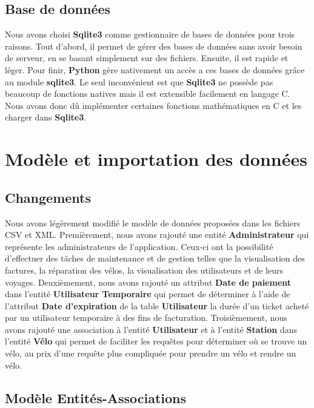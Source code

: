 \documentclass[a4paper,11pt]{report}
\begin{document}
\section{Base de données}
Nous avons choisi \textbf{Sqlite3} comme gestionnaire de bases de données pour trois raisons. Tout d'abord, il permet de gérer des bases de données sans avoir besoin de serveur, en se basant simplement sur des fichiers. Ensuite, il est rapide et léger. Pour finir, \textbf{Python} gère nativement un accès a ces bases de données grâce au module \textbf{sqlite3}.
Le seul inconvénient est que \textbf{Sqlite3} ne possède pas beaucoup de fonctions natives mais il est extensible facilement en langage C.
Nous avons donc dû implémenter certaines fonctions mathématiques en C et les charger dans \textbf{Sqlite3}.

\chapter{Modèle et importation des données}

\section{Changements}
Nous avons légèrement modifié le modèle de données proposées dans les fichiers CSV et XML.
Premièrement, nous avons rajouté une entité \textbf{Administrateur} qui représente les administrateurs de l'application. Ceux-ci ont la possibilité d'effectuer des tâches de maintenance et de gestion telles que la visualisation des factures, la réparation des vélos, la visualisation des utilisateurs et de leurs voyages.
Deuxièmement, nous avons rajouté un attribut \textbf{Date de paiement} dans l'entité \textbf{Utilisateur Temporaire} qui permet de déterminer à l'aide de l'attribut \textbf{Date d'expiration} de la table \textbf{Utilisateur} la durée d'un ticket acheté par un utilisateur temporaire à des fins de facturation.
Troisièmement, nous avons rajouté une association à l'entité \textbf{Utilisateur} et à l'entité \textbf{Station} dans l'entité \textbf{Vélo} qui permet de faciliter les requêtes pour déterminer où se trouve un vélo, au prix d'une requête plus compliquée pour prendre un vélo et rendre un vélo.

\section{Modèle Entités-Associations}
\end{document}
